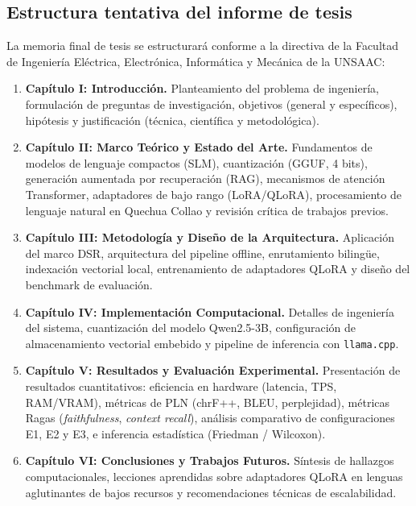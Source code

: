 \subsection{Estructura tentativa del informe de tesis}

La memoria final de tesis se estructurará conforme a la directiva de la Facultad de Ingeniería Eléctrica, Electrónica, Informática y Mecánica de la UNSAAC:

\begin{enumerate}[leftmargin=1.5em, itemsep=0.3em]
  \item \textbf{Capítulo I: Introducción.} Planteamiento del problema de ingeniería, formulación de preguntas de investigación, objetivos (general y específicos), hipótesis y justificación (técnica, científica y metodológica).
  \item \textbf{Capítulo II: Marco Teórico y Estado del Arte.} Fundamentos de modelos de lenguaje compactos (SLM), cuantización (GGUF, 4 bits), generación aumentada por recuperación (RAG), mecanismos de atención Transformer, adaptadores de bajo rango (LoRA/QLoRA), procesamiento de lenguaje natural en Quechua Collao y revisión crítica de trabajos previos.
  \item \textbf{Capítulo III: Metodología y Diseño de la Arquitectura.} Aplicación del marco DSR, arquitectura del pipeline offline, enrutamiento bilingüe, indexación vectorial local, entrenamiento de adaptadores QLoRA y diseño del benchmark de evaluación.
  \item \textbf{Capítulo IV: Implementación Computacional.} Detalles de ingeniería del sistema, cuantización del modelo Qwen2.5-3B, configuración de almacenamiento vectorial embebido y pipeline de inferencia con \texttt{llama.cpp}.
  \item \textbf{Capítulo V: Resultados y Evaluación Experimental.} Presentación de resultados cuantitativos: eficiencia en hardware (latencia, TPS, RAM/VRAM), métricas de PLN (chrF++, BLEU, perplejidad), métricas Ragas (\textit{faithfulness}, \textit{context recall}), análisis comparativo de configuraciones E1, E2 y E3, e inferencia estadística (Friedman / Wilcoxon).
  \item \textbf{Capítulo VI: Conclusiones y Trabajos Futuros.} Síntesis de hallazgos computacionales, lecciones aprendidas sobre adaptadores QLoRA en lenguas aglutinantes de bajos recursos y recomendaciones técnicas de escalabilidad.
\end{enumerate}
